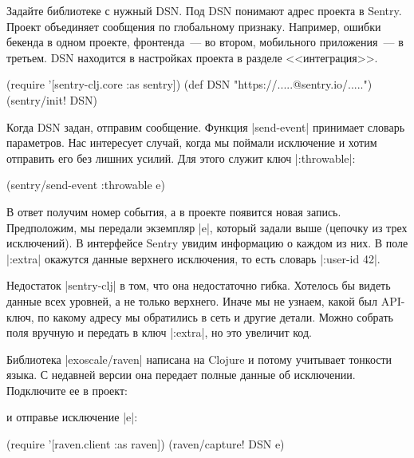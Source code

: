 Задайте библиотеке с нужный DSN. Под DSN понимают адрес проекта в Sentry. Проект
объединяет сообщения по глобальному признаку. Например, ошибки бекенда в одном
проекте, фронтенда~--- во втором, мобильного приложения~--- в третьем. DSN
находится в настройках проекта в разделе <<интеграция>>.

\begin{english}
  \begin{clojure}
(require '[sentry-clj.core :as sentry])
(def DSN "https://.....@sentry.io/.....")
(sentry/init! DSN)
  \end{clojure}
\end{english}

Когда DSN задан, отправим сообщение. Функция \spverb|send-event| принимает
словарь параметров. Нас интересует случай, когда мы поймали исключение и хотим
отправить его без лишних усилий. Для этого служит ключ \spverb|:throwable|:

\begin{english}
  \begin{clojure}
(sentry/send-event {:throwable e})
  \end{clojure}
\end{english}

В ответ получим номер события, а в проекте появится новая запись. Предположим,
мы передали экземпляр \spverb|e|, который задали выше (цепочку из трех
исключений). В интерфейсе Sentry увидим информацию о каждом из них. В поле
\spverb|:extra| окажутся данные верхнего исключения, то есть словарь
\spverb|{:user-id 42}|.

Недостаток \spverb|sentry-clj| в том, что она недостаточно гибка. Хотелось бы
видеть данные всех уровней, а не только верхнего. Иначе мы не узнаем, какой был
API-ключ, по какому адресу мы обратились в сеть и другие детали. Можно собрать
поля вручную и передать в ключ \spverb|:extra|, но это увеличит код.

Библиотека \spverb|exoscale/raven| написана на Clojure и потому учитывает
тонкости языка. С недавней версии она передает полные данные об
исключении. Подключите ее в проект:

\begin{english}
  \begin{clojure}
  \end{clojure}
\end{english}

\noindent
и отправье исключение \spverb|e|:

\begin{english}
  \begin{clojure}
(require '[raven.client :as raven])
(raven/capture! DSN e)
  \end{clojure}
\end{english}

